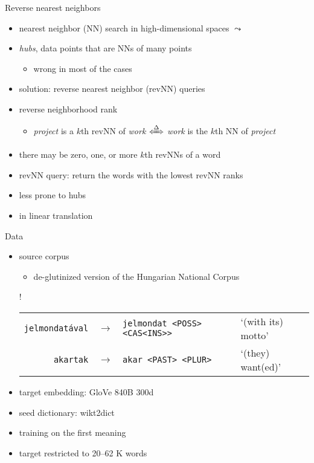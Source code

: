 \documentclass[10pt]{beamer}%
\newcommand{\bull}[1]{\begin{itemize}\item #1 \end{itemize}}
\begin{document}
\begin{frame}{Reverse nearest neighbors}
  \begin{itemize}
    \item nearest neighbor (NN) search in high-dimensional spaces $\leadsto$
    \item \emph{hubs}, data points that are NNs of many points
      \bull{wrong in most of the cases  \citep{Radovanovic:2010}}
    \item solution: reverse nearest neighbor (revNN) queries \\ \citep{Korn:2000}
    \item reverse neighborhood rank
      \bull{\emph{project} is a $k$th revNN of \emph{work}
      $\xLeftrightarrow\Delta$
      \emph{work} is the $k$th NN of \emph{project}}
    \item there may be zero, one, or more $k$th revNNs of a word
    \item revNN query: return the words with the lowest revNN ranks
    \item less prone to hubs
    \item in linear translation \citep{Dinu:2015,Lazaridou:2015}
  \end{itemize}
\end{frame}

\begin{frame}{Data}
  \begin{itemize}
    \item source corpus
      \bull{
      de-glutinized version \citep{Borbely:2016d,Nemeskey:2017} of the
      Hungarian National Corpus \citep{Oravecz:2014}}
    \begin{center}
        \resizebox{\textwidth} {!} {%
      \begin{tabular}{rcll}
         \texttt{jelmondatával} & $\rightarrow$ & \texttt{jelmondat <POSS> <CAS<INS>>} & `(with its) motto'\\
    \texttt{akartak} & $\rightarrow$ & \texttt{akar <PAST> <PLUR>} & `(they)
      want(ed)'\\
      \end{tabular}
      }
    \end{center}
    \item target embedding: GloVe 840B 300d \citep{Pennington:2014}
    \item seed dictionary: wikt2dict \citep{Acs:2013}
    \item training on the first meaning
    \item target restricted to 20--62 K words
  \end{itemize}
\end{frame}
\end{document}
